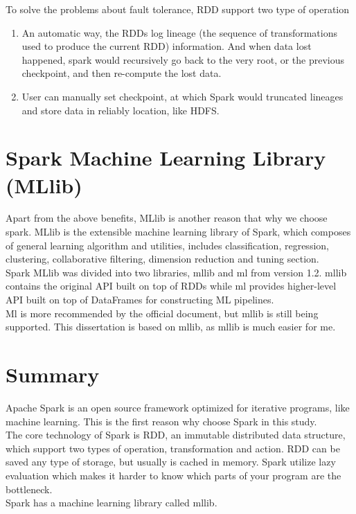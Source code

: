 To solve the problems about fault tolerance, RDD support two type of operation

\begin{enumerate}
	\item An automatic way, the RDDs log lineage (the sequence of transformations used to produce the current RDD) information. And when data lost happened, spark would recursively go back to the very root, or the previous checkpoint, and then re-compute the lost data.
	\item User can manually set checkpoint, at which Spark would truncated lineages and store data in reliably location, like HDFS.
\end{enumerate}

\clearpage
\section{Spark Machine Learning Library (MLlib)\cite{apache_spark_mllib}}
Apart from the above benefits, MLlib is another reason that why we choose spark. MLlib is the extensible machine learning  library of Spark, which composes of general learning algorithm and utilities, includes classification, regression, clustering, collaborative filtering, dimension reduction and tuning section.\\


Spark MLlib was divided into two libraries, mllib and ml from version 1.2. mllib contains the original API built on top of RDDs while ml provides higher-level API built on top of DataFrames for constructing ML pipelines.\\



Ml is more recommended by the official document, but mllib is still being supported. This dissertation is based on mllib, as mllib is much easier for me.


\section{Summary}
Apache Spark is an open source framework optimized for iterative programs, like machine learning. This is the first reason why choose Spark in this study.\\


The core technology of Spark is RDD, an immutable distributed data structure, which support two types of operation, transformation and action. RDD can be saved any type of storage, but usually is cached in memory. Spark utilize lazy evaluation which makes it harder to know which parts of your program are the bottleneck.\\


Spark has a machine learning library called mllib.


